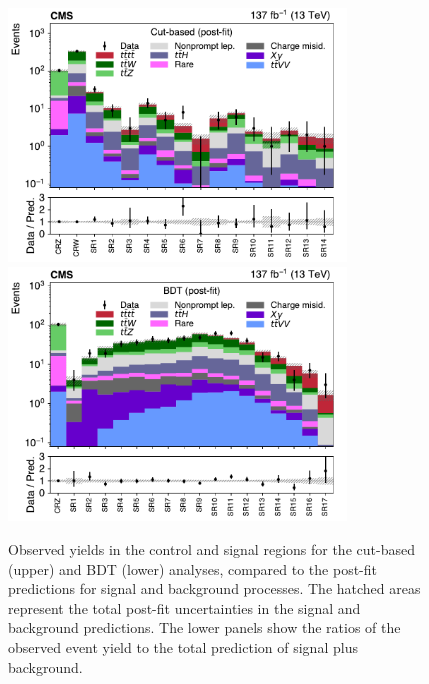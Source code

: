 \begin{figure}[!hbtp]
\centering
\includegraphics[width=0.8\textwidth]{figs/ftp/SRCR_postfit.pdf} \\
\includegraphics[width=0.8\textwidth]{figs/ftp/SRDISC_postfit.pdf}
\caption{ Observed yields in the control and signal regions for the cut-based (upper) and BDT (lower) analyses,
compared to the post-fit predictions for signal and background processes.
The hatched areas represent the total post-fit uncertainties in the signal and background predictions.
The lower panels show the ratios of the observed event yield to the total prediction of
    signal plus background.
    }
\label{fig:srcr}
\end{figure}


